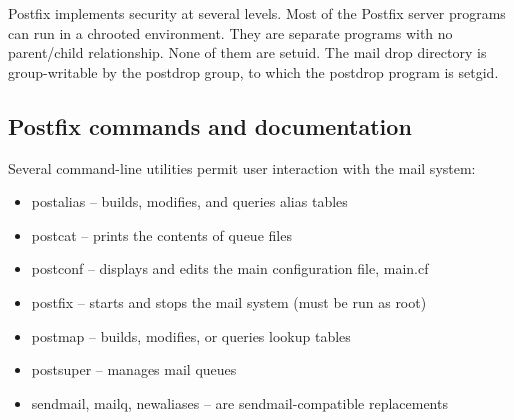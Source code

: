 \protect\hypertarget{part0026_split_059.htmlux5cux23_idIndexMarker2697}{}{}\protect\hypertarget{part0026_split_059.htmlux5cux23_idIndexMarker2698}{}{}Postfix
implements security at several levels. Most of the Postfix server
programs can run in a {chroot}ed environment. They are separate programs
with no {parent/child} relationship. None of them are setuid. The mail
drop directory is group-writable by the postdrop group, to which the
{postdrop}
\protect\hypertarget{part0026_split_059.htmlux5cux23_idIndexMarker2699}{}{}program
is setgid.

\protect\hypertarget{part0026_split_060.html}{}{}

\hypertarget{part0026_split_060.htmlux5cux23_idContainer1247}{}
\hypertarget{part0026_split_060.htmlux5cux23calibre_pb_59}{%
\subsection[Postfix commands and
documentation]{\texorpdfstring{\protect\hypertarget{part0026_split_060.htmlux5cux23_idTextAnchor1171}{}{}Postfix
commands and
documentation}{Postfix commands and documentation}}\label{part0026_split_060.htmlux5cux23calibre_pb_59}}

\protect\hypertarget{part0026_split_060.htmlux5cux23_idIndexMarker2700}{}{}Several
command-line utilities permit user interaction with the mail system:

\begin{itemize}
\tightlist
\item
  \protect\hypertarget{part0026_split_060.htmlux5cux23_idIndexMarker2701}{}{}{postalias}
  -- builds, modifies, and queries alias tables
\item
  \protect\hypertarget{part0026_split_060.htmlux5cux23_idIndexMarker2702}{}{}{postcat}
  -- prints the contents of queue files
\item
  \protect\hypertarget{part0026_split_060.htmlux5cux23_idIndexMarker2703}{}{}{postconf}
  -- displays and edits the main configuration file, {main.cf}
\item
  \protect\hypertarget{part0026_split_060.htmlux5cux23_idIndexMarker2704}{}{}{postfix}
  -- starts and stops the mail system (must be run as root)
\item
  \protect\hypertarget{part0026_split_060.htmlux5cux23_idIndexMarker2705}{}{}{postmap}
  -- builds, modifies, or queries lookup tables
\item
  \protect\hypertarget{part0026_split_060.htmlux5cux23_idIndexMarker2706}{}{}{postsuper}
  -- manages mail queues
\item
  {sendmail}, {mailq}, {newaliases} -- are {sendmail}-compatible
  replacements
\end{itemize}

